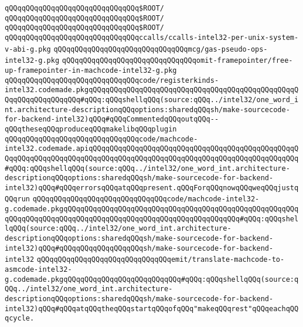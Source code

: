 \verb|qQQqqQQqqQQqqQQqqQQqqQQqqQQqqQQq$ROOT/|\newline
\verb|qQQqqQQqqQQqqQQqqQQqqQQqqQQqqQQq$ROOT/|\newline
\verb|qQQqqQQqqQQqqQQqqQQqqQQqqQQqqQQq$ROOT/|\newline
\newline
\verb|qQQqqQQqqQQqqQQqqQQqqQQqqQQqqQQqccalls/ccalls-intel32-per-unix-system-v-abi-g.pkg|\newline
\verb|qQQqqQQqqQQqqQQqqQQqqQQqqQQqqQQqmcg/gas-pseudo-ops-intel32-g.pkg|\newline
\verb|qQQqqQQqqQQqqQQqqQQqqQQqqQQqqQQqomit-framepointer/free-up-framepointer-in-machcode-intel32-g.pkg|\newline
\verb|qQQqqQQqqQQqqQQqqQQqqQQqqQQqqQQqcode/registerkinds-intel32.codemade.pkgqQQqqQQqqQQqqQQqqQQqqQQqqQQqqQQqqQQqqQQqqQQqqQQqqQQqqQQqqQQqqQQqqQQq#qQQq:qQQqshellqQQq(source:qQQq../intel32/one_word_int.architecture-descriptionqQQqoptions:sharedqQQqsh/make-sourcecode-for-backend-intel32)qQQq#qQQqCommentedqQQqoutqQQq--qQQqtheseqQQqproduceqQQqmakelibqQQqplugin|\newline
\verb|qQQqqQQqqQQqqQQqqQQqqQQqqQQqqQQqcode/machcode-intel32.codemade.apiqQQqqQQqqQQqqQQqqQQqqQQqqQQqqQQqqQQqqQQqqQQqqQQqqQQqqQQqqQQqqQQqqQQqqQQqqQQqqQQqqQQqqQQqqQQqqQQqqQQqqQQqqQQqqQQqqQQqqQQq#qQQq:qQQqshellqQQq(source:qQQq../intel32/one_word_int.architecture-descriptionqQQqoptions:sharedqQQqsh/make-sourcecode-for-backend-intel32)qQQq#qQQqerrorsqQQqatqQQqpresent.qQQqForqQQqnowqQQqweqQQqjustqQQqrun|\newline
\verb|qQQqqQQqqQQqqQQqqQQqqQQqqQQqqQQqcode/machcode-intel32-g.codemade.pkgqQQqqQQqqQQqqQQqqQQqqQQqqQQqqQQqqQQqqQQqqQQqqQQqqQQqqQQqqQQqqQQqqQQqqQQqqQQqqQQqqQQqqQQqqQQqqQQqqQQqqQQqqQQqqQQq#qQQq:qQQqshellqQQq(source:qQQq../intel32/one_word_int.architecture-descriptionqQQqoptions:sharedqQQqsh/make-sourcecode-for-backend-intel32)qQQq#qQQqqQQqqQQqqQQqqQQqsh/make-sourcecode-for-backend-intel32|\newline
\verb|qQQqqQQqqQQqqQQqqQQqqQQqqQQqqQQqemit/translate-machcode-to-asmcode-intel32-g.codemade.pkgqQQqqQQqqQQqqQQqqQQqqQQqqQQq#qQQq:qQQqshellqQQq(source:qQQq../intel32/one_word_int.architecture-descriptionqQQqoptions:sharedqQQqsh/make-sourcecode-for-backend-intel32)qQQq#qQQqatqQQqtheqQQqstartqQQqofqQQq"makeqQQqrest"qQQqeachqQQqcycle.|\newline
